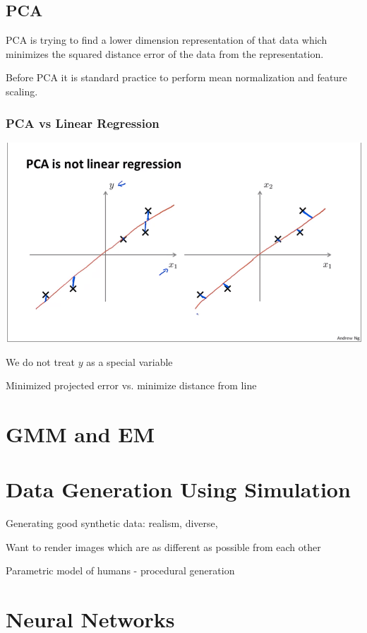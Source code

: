 \subsection{PCA}

PCA is trying to find a lower dimension representation of that data which minimizes the squared distance error of the data from the representation.

Before PCA it is standard practice to perform mean normalization and feature scaling. 

\subsubsection{PCA vs Linear Regression}

\includegraphics[width=0.9\columnwidth]{ml_figures/PCA_Linear.png}

We do not treat $y$ as a special variable

Minimized projected error vs. minimize distance from line

\section{GMM and EM}


\section{Data Generation Using Simulation}

Generating good synthetic data: 
realism, 
diverse,


Want to render images which are as different as possible from each other

Parametric model of humans - procedural generation

\section{Neural Networks}

